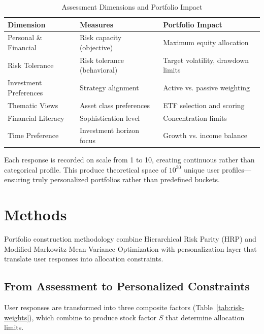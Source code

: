 \documentclass[11pt]{article}
\begin{document}
\begin{table}[H]
\centering
\caption{Assessment Dimensions and Portfolio Impact}
\label{tab:dimension-purpose}
\begin{tabular}{lll}
\toprule
\textbf{Dimension} & \textbf{Measures} & \textbf{Portfolio Impact} \\
\midrule
Personal \& Financial & Risk capacity (objective) & Maximum equity allocation \\
Risk Tolerance & Risk tolerance (behavioral) & Target volatility, drawdown limits \\
Investment Preferences & Strategy alignment & Active vs. passive weighting \\
Thematic Views & Asset class preferences & ETF selection and scoring \\
Financial Literacy & Sophistication level & Concentration limits \\
Time Preference & Investment horizon focus & Growth vs. income balance \\
\bottomrule
\end{tabular}
\end{table}

Each response is recorded on scale from 1 to 10, creating continuous rather than categorical profile. This produce theoretical space of $10^{30}$ unique user profiles—ensuring truly personalized portfolios rather than predefined buckets.


\section{Methods}

Portfolio construction methodology combine Hierarchical Risk Parity (HRP) and Modified Markowitz Mean-Variance Optimization with personalization layer that translate user responses into allocation constraints.

\subsection{From Assessment to Personalized Constraints}

User responses are transformed into three composite factors (Table~\ref{tab:risk-weights}), which combine to produce stock factor $S$ that determine allocation limits.
\end{document}
